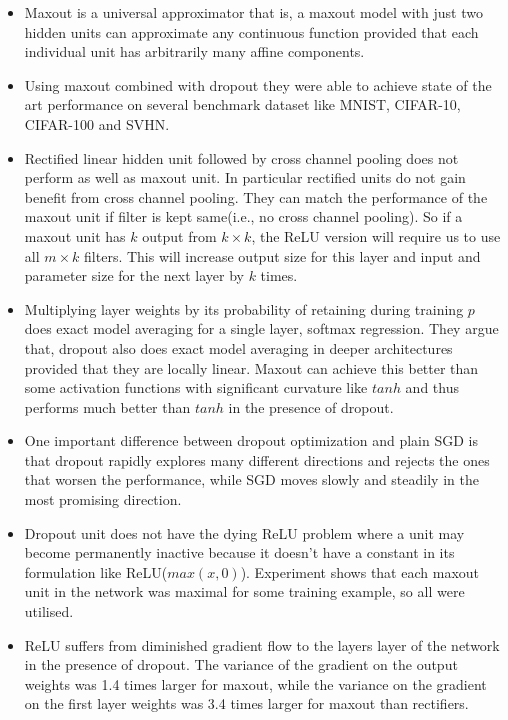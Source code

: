 \documentclass{article}
\begin{document}
\begin{itemize}
    \item Maxout is a universal approximator that is, a maxout model with just two hidden units can approximate any continuous function provided that each individual unit has arbitrarily many affine components.
    \item Using maxout combined with dropout they were able to achieve state of the art performance on several benchmark dataset like MNIST, CIFAR-10, CIFAR-100 and SVHN.
    \item Rectified linear hidden unit followed by cross channel pooling does not perform as well as maxout unit. In particular rectified units do not gain benefit from cross channel pooling. They can match the performance of the maxout unit if filter is kept same(i.e., no cross channel pooling). So if a maxout unit has $k$ output from $k\times k$, the ReLU version will require us to use all $m\times k$ filters. This will increase output size for this layer and input and parameter size for the next layer by $k$ times.
    \item Multiplying layer weights by its probability of retaining during training $p$ does exact model averaging for a single layer, softmax regression. They argue that, dropout also does exact model averaging in deeper architectures provided that they are locally linear. Maxout can achieve this better than some activation functions with significant curvature like $tanh$ and thus performs much better than $tanh$ in the presence of dropout.   
    \item One important difference between dropout optimization and plain SGD is that dropout rapidly explores many different directions and rejects the ones that worsen the performance, while SGD moves slowly and steadily in the most promising direction.
    \item Dropout unit does not have the dying ReLU problem where a unit may become permanently inactive because it doesn't have a constant in its formulation like ReLU($max(x,0)$). Experiment shows that each maxout unit in the network was maximal for some training example, so all were utilised. 
    \item ReLU suffers from diminished gradient flow to the layers layer of the network in the presence of dropout. The variance of the gradient on the output weights was 1.4 times larger for maxout, while the variance on the gradient on the first layer weights was 3.4 times larger for maxout than rectifiers. 
\end{itemize}
\end{document}
